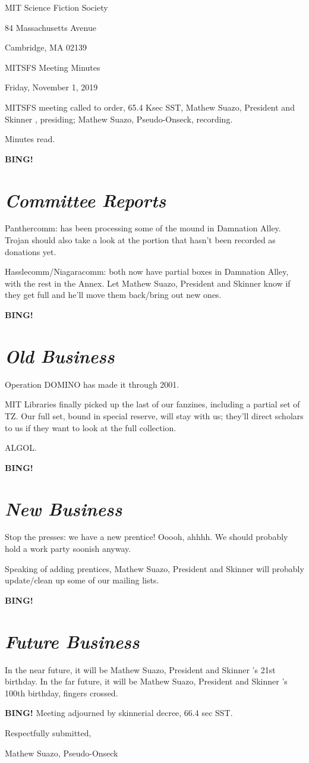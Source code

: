 \documentclass[10pt]{article}
\newcommand{\bing}{{\bf BING!} }
\newcommand{\goto}[1]{\bing \vskip 12pt \section*{{\em{#1}}}}
\newcommand{\skinner}{Mathew Suazo, President and Skinner }
\newcommand{\onseck}{Mathew Suazo, Pseudo-Onseck}
\newcommand{\meetingdate}{Friday, November 1, 2019 }
\begin{document}
\begin{center}

MIT Science Fiction Society

84 Massachusetts Avenue

Cambridge, MA 02139

\vspace{12pt}

MITSFS Meeting Minutes

\meetingdate

\end{center}

\vspace{18pt}

\setlength{\parskip}{6pt}

\noindent
MITSFS meeting called to order, 65.4 Ksec SST,
\skinner, presiding; \onseck, recording.

Minutes read.

\goto{Committee Reports}

Panthercomm: has been processing some of the mound in Damnation Alley. Trojan should also take a look at the portion that hasn't been recorded as donations yet.

Hasslecomm/Niagaracomm: both now have partial boxes in Damnation Alley, with the rest in the Annex. Let \skinner know if they get full and he'll move them back/bring out new ones.

\goto{Old Business}

Operation DOMINO has made it through 2001.

MIT Libraries finally picked up the last of our fanzines, including a partial set of TZ. Our full set, bound in special reserve, will stay with us; they'll direct scholars to us if they want to look at the full collection.

ALGOL.

\goto{New Business}

Stop the presses: we have a new prentice! Ooooh, ahhhh. We should probably hold a work party soonish anyway.

Speaking of adding prentices, \skinner will probably update/clean up some of our mailing lists.

\goto{Future Business}

In the near future, it will be \skinner's 21st birthday. In the far future, it will be \skinner's 100th birthday, fingers crossed.

\bing
\noindent
Meeting adjourned by skinnerial decree, 66.4 sec SST.

\vspace{18pt}

\centerline{Respectfully submitted,}
\centerline{\onseck}
\end{document}
